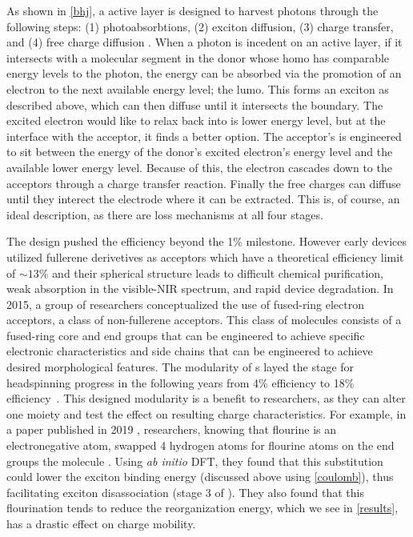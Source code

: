 As shown in \ref{bhj}, a  active layer is designed to harvest photons through the following 
steps: (1) photoabsorbtions, 
(2) exciton diffusion, (3) charge transfer, and (4) free charge diffusion \cite{Fusella2019}. 
When a photon is incedent on
an  active layer, if it intersects with a molecular segment in the donor whose 
\gls{homo} has comparable energy levels to the photon, 
the energy can be absorbed via the promotion of
an electron to the next available energy level; the \gls{lumo}.
This forms an exciton as
described above, which can then diffuse until it intersects the boundary. 
The excited electron would like to relax
back into is lower energy level, but at the interface with the acceptor, it finds a better option. The
acceptor's  is engineered to sit between the energy of the donor's excited electron's energy level and the
available lower energy level. Because of this, the electron cascades down to the acceptors  through a charge
transfer reaction. Finally the free charges can diffuse until they interect the electrode where it can be
extracted. This is, of course, an ideal description, as there are loss mechanisms at all four stages. 

The  design pushed the efficiency beyond the 1\% milestone. However early  devices utilized
fullerene derivetives as acceptors which have a theoretical efficiency limit of $\sim13\%$ \cite{Scharber2016}
and their spherical
structure leads to difficult chemical purification, weak absorption in the visible-NIR spectrum, and rapid
device degradation. In 2015, a group of researchers conceptualized the use of
fused-ring electron acceptors, a class of non-fullerene acceptors. This class of molecules consists of
a fused-ring core and end groups that can be engineered to achieve specific electronic characteristics and side
chains that can be engineered to achieve desired morphological features. The modularity of s
layed the stage for headspinning progress in the following years from 4\% efficiency to 18\% 
efficiency~\cite{Wang2021a}. 
This designed modularity is a benefit to researchers, as they can alter one moiety and test
the effect on resulting charge characteristics. For example, in a paper published in 2019 \cite{Benatto2019},
researchers, knowing that flourine is an electronegative atom, swapped 4 hydrogen atoms for flourine atoms on
the end groups the  molecule . Using \textit{ab initio} DFT, they found 
that this substitution could lower the exciton
binding energy (discussed above using \autoref{coulomb}), thus facilitating exciton disassociation (stage 3 of
). They also found
that this flourination tends to reduce the reorganization energy, which we see in \autoref{results}, has a
drastic effect on charge mobility.

